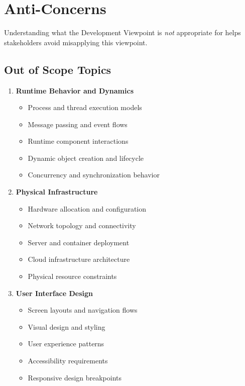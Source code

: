 \documentclass[11pt,letterpaper]{article}
\begin{document}
\section{Anti-Concerns}

Understanding what the Development Viewpoint is \emph{not} appropriate for helps stakeholders avoid misapplying this viewpoint.

\subsection{Out of Scope Topics}

\begin{enumerate}[label=\textbf{AC\arabic*:}, leftmargin=2.5em]
    \item \textbf{Runtime Behavior and Dynamics}
    \begin{itemize}[nosep]
        \item Process and thread execution models
        \item Message passing and event flows
        \item Runtime component interactions
        \item Dynamic object creation and lifecycle
        \item Concurrency and synchronization behavior
    \end{itemize}
    
    \item \textbf{Physical Infrastructure}
    \begin{itemize}[nosep]
        \item Hardware allocation and configuration
        \item Network topology and connectivity
        \item Server and container deployment
        \item Cloud infrastructure architecture
        \item Physical resource constraints
    \end{itemize}
    
    \item \textbf{User Interface Design}
    \begin{itemize}[nosep]
        \item Screen layouts and navigation flows
        \item Visual design and styling
        \item User experience patterns
        \item Accessibility requirements
        \item Responsive design breakpoints
    \end{itemize}
    

\end{enumerate}
\end{document}

